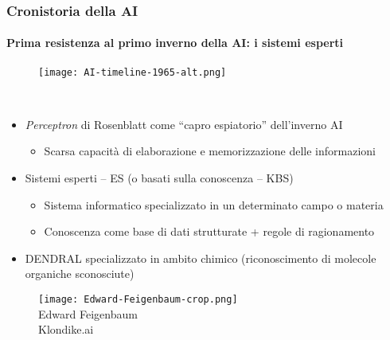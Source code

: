 %
\begin{frame}[t] \frametitle{Cronistoria della AI}
{\scriptsize
{}
\framesubtitle{Prima resistenza al primo inverno della AI: i sistemi esperti}
\vspace*{-.5cm}
	\begin{minipage}[t]{\textwidth}
		\begin{figure}[ht]
			\centering
			\texttt{[image: AI-timeline-1965-alt.png]}
		\end{figure}
	\end{minipage}
	\\\vspace*{.3cm}
	\begin{minipage}[t]{\textwidth}
		\begin{minipage}[t]{0.6\textwidth}
			\begin{itemize}[leftmargin=10pt,align=right]
				\onslide<2->\item[\alert{\faHandORight}] \emph{Perceptron} di Rosenblatt come ``capro espiatorio'' dell'inverno AI
				\begin{itemize}[leftmargin=10pt,align=right]
					\item[\alert{\faHandORight}] Scarsa capacità di \alert{elaborazione} e \alert{memorizzazione} delle informazioni
				\end{itemize}
				\item[\alert{\faHandORight}] \alert{Sistemi esperti} -- ES (o \alert{basati sulla conoscenza} -- KBS)
				\begin{itemize}[leftmargin=10pt,align=right]
					\item[\alert{\faHandORight}] Sistema informatico specializzato in un determinato campo o materia
					\item[\alert{\faHandORight}] Conoscenza come base di dati strutturate + regole di ragionamento
				\end{itemize}
				\item[\alert{\faHandORight}] DENDRAL specializzato in ambito \alert{chimico} (riconoscimento di molecole organiche sconosciute)
			\end{itemize}
		\end{minipage}
		\begin{minipage}[t]{0.4\textwidth}
			\centering
			\begin{figure}[ht]
				\texttt{[image: Edward-Feigenbaum-crop.png]}
				\\Edward Feigenbaum\\\textsuperscript{\textcopyright}Klondike.ai
			\end{figure}
		\end{minipage}
	\end{minipage}
}
\end{frame}
